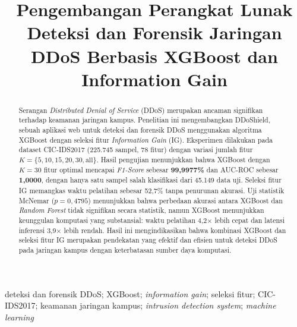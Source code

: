 \documentclass[conference,a4paper]{IEEEtran}
\begin{document}
\title{Pengembangan Perangkat Lunak Deteksi dan Forensik Jaringan DDoS Berbasis XGBoost dan Information Gain}

\author{
}

\maketitle
\vspace{-0.35cm}

\begin{abstract}
Serangan \textit{Distributed Denial of Service} (DDoS) merupakan ancaman
signifikan terhadap keamanan jaringan kampus. Penelitian ini mengembangkan
DDoShield, sebuah aplikasi web untuk deteksi dan forensik DDoS menggunakan
algoritma XGBoost dengan seleksi fitur \textit{Information Gain} (IG).
Eksperimen dilakukan pada dataset CIC-IDS2017 (225.745 sampel, 78 fitur)
dengan variasi jumlah fitur $K = \{5, 10, 15, 20, 30, \text{all}\}$.
Hasil pengujian menunjukkan bahwa XGBoost dengan $K=30$ fitur optimal
mencapai \textit{F1-Score} sebesar \textbf{99,9977\%} dan AUC-ROC
sebesar \textbf{1,0000}, dengan hanya satu sampel salah klasifikasi dari
45.149 data uji. Seleksi fitur IG memangkas waktu pelatihan sebesar
52,7\% tanpa penurunan akurasi. Uji statistik McNemar ($p=0{,}4795$)
menunjukkan bahwa perbedaan akurasi antara XGBoost dan \textit{Random
Forest} tidak signifikan secara statistik, namun XGBoost menunjukkan
keunggulan komputasi yang substansial: waktu pelatihan 4,2$\times$ lebih
cepat dan latensi inferensi 3,9$\times$ lebih rendah.
Hasil ini mengindikasikan bahwa kombinasi XGBoost dan seleksi fitur IG
merupakan pendekatan yang efektif dan efisien untuk deteksi DDoS pada
jaringan kampus dengan keterbatasan sumber daya komputasi.
\end{abstract}

\begin{IEEEkeywords}
deteksi dan forensik DDoS; XGBoost; \textit{information gain}; seleksi fitur; CIC-IDS2017;
keamanan jaringan kampus; \textit{intrusion detection system}; \textit{machine
learning}
\end{IEEEkeywords}
\end{document}
